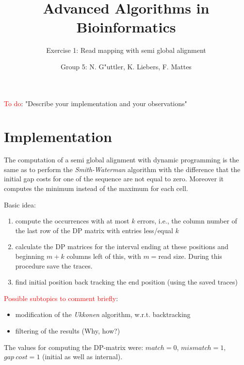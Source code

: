 \documentclass[11pt, notitlepage]{scrartcl}
\begin{document}
         


\title{Advanced Algorithms in Bioinformatics} 
\subtitle{Exercise 1: Read mapping with semi global alignment}
\author{Group 5: N. G"uttler, K. Liebers, F. Mattes} %
\maketitle


\textcolor{red}{To do}: "Describe your implementation and your observations"

\section{Implementation}
The computation of a semi global alignment with dynamic programming is the same as to perform the \textit{Smith-Waterman} algorithm with the difference that the initial gap costs for one of the sequence are not equal to zero. Moreover it computes the minimum instead of the maximum for each cell.

Basic idea:
\begin{enumerate}
	\item compute the occurrences with at most $k$ errors, i.e., the column number of the last row of the DP matrix with entries less/equal $k$
	\item calculate the DP matrices for the interval ending at these positions and beginning $m+k$ columns left of this, with $m=$read size. During this procedure save the traces.
	\item find initial position back tracking the end position (using the saved traces)
\end{enumerate}
\textcolor{red}{Possible subtopics to comment briefly}:
\begin{itemize}
	\item modification of the \textit{Ukkonen} algorithm, w.r.t. backtracking
	\item filtering of the results (Why, how?)

\end{itemize}

The values for computing the DP-matrix were: 	$match = 0$, $mismatch = 1$, $gap \ cost =1$ (initial as well as internal).
\end{document}
